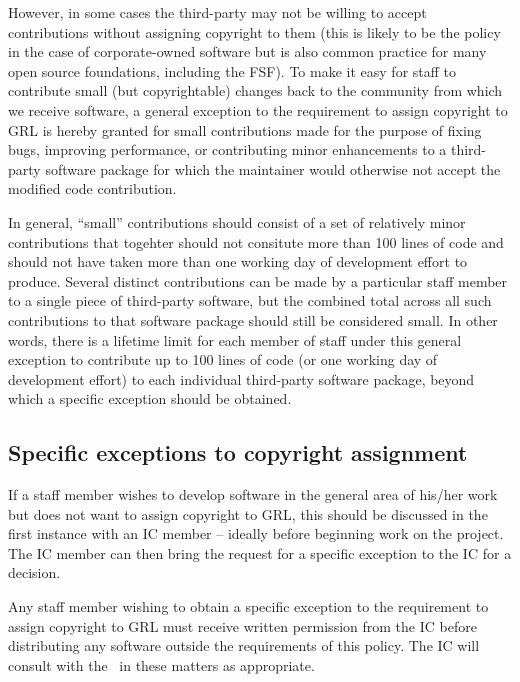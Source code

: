 \documentclass[10pt,a4paper]{article}
\begin{document}
\begin{itemize}
\par However, in some cases the third-party may not be willing to accept contributions 
without assigning copyright to them (this is likely to be the policy in the case of 
corporate-owned software but is also common practice for many open source 
foundations, including the FSF). To make it easy for staff to contribute small 
(but copyrightable) changes back to the community from which we receive 
software, a general exception to the requirement to assign copyright to GRL is 
hereby granted for small contributions made for the purpose of fixing bugs, 
improving performance, or contributing minor enhancements to a third-party 
software package for which the maintainer would otherwise not accept the 
modified code contribution. 

\par In general, ``small'' contributions should consist of a set of relatively minor 
contributions that togehter should not consitute more than 100 lines of code 
and should not have taken more than one working day of development effort 
to produce. Several distinct contributions can be made by a particular staff 
member to a single piece of third-party software, but the combined total across 
all such contributions to that software package should still be considered small. 
In other words, there is a lifetime limit for each member of staff under this general 
exception to contribute up to 100 lines of code (or one working day of 
development effort) to each individual third-party software package, beyond 
which a specific exception should be obtained. 

\end{itemize}


\subsection{Specific exceptions to copyright assignment}
\label{section:exceptions.special}

\par If a staff member wishes to develop software in the general area of his/her work 
but does not want to assign copyright to GRL, this should be discussed in the first 
instance with an IC member -- ideally before beginning work on the project. The IC 
member can then bring the request for a specific exception to the IC for a decision. 

\par Any staff member wishing to obtain a specific exception to the requirement to 
assign copyright to GRL must receive written permission from the IC before 
distributing any software outside the requirements of this policy. The IC will consult 
with the \exectitle\ in these matters as appropriate. 
\end{document}
